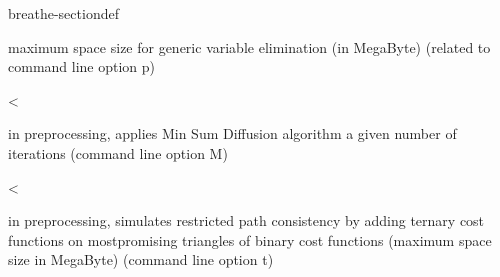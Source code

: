 \documentclass[letterpaper,10pt,openany,oneside,english]{sphinxmanual}
\begin{document}
\begin{fulllineitems}
\begin{sphinxuseclass}{breathe-sectiondef}
\begin{fulllineitems}
\sphinxAtStartPar
maximum space size for generic variable elimination (in MegaByte) (related to command line option \sphinxhyphen{}p) 

\end{fulllineitems}


\begin{fulllineitems}
\label{\detokenize{ref/ref_cpp:_CPPv4N8ToulBar220preprocessTernaryRPCE}}\label{\detokenize{ref/ref_cpp:_CPPv3N8ToulBar220preprocessTernaryRPCE}}\label{\detokenize{ref/ref_cpp:_CPPv2N8ToulBar220preprocessTernaryRPCE}}\label{\detokenize{ref/ref_cpp:ToulBar2::preprocessTernaryRPC__i}}
\pysigstartsignatures
\pysigstartmultiline
{}
\pysigstopmultiline
\pysigstopsignatures
\sphinxAtStartPar
\textless{} 

\sphinxAtStartPar
in preprocessing, applies Min Sum Diffusion algorithm a given number of iterations (command line option \sphinxhyphen{}M) 

\end{fulllineitems}


\begin{fulllineitems}
\label{\detokenize{ref/ref_cpp:_CPPv4N8ToulBar23pwcE}}\label{\detokenize{ref/ref_cpp:_CPPv3N8ToulBar23pwcE}}\label{\detokenize{ref/ref_cpp:_CPPv2N8ToulBar23pwcE}}\label{\detokenize{ref/ref_cpp:ToulBar2::pwc__i}}
\pysigstartsignatures
\pysigstartmultiline
{}
\pysigstopmultiline
\pysigstopsignatures
\sphinxAtStartPar
\textless{} 

\sphinxAtStartPar
in preprocessing, simulates restricted path consistency by adding ternary cost functions on most\sphinxhyphen{}promising triangles of binary cost functions (maximum space size in MegaByte) (command line option \sphinxhyphen{}t) 


\end{fulllineitems}
\end{sphinxuseclass}
\end{fulllineitems}
\end{document}
